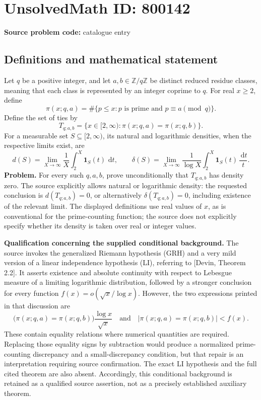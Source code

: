 \documentclass[11pt]{article}
\newcommand{\Z}{\mathbb{Z}}
\newcommand{\dd}{\,\mathrm{d}}
\begin{document}
\section*{UnsolvedMath ID: 800142}
\textbf{Source problem code:} catalogue entry
\subsection{Definitions and mathematical statement}
Let \(q\) be a positive integer, and let \(a,b\in\Z/q\Z\) be distinct reduced residue classes, meaning that each class is represented by an integer coprime to \(q\). For real \(x\geq 2\), define
\[
\pi(x;q,a)=\#\{p\leq x:p\text{ is prime and }p\equiv a\pmod q\}.
\]
Define the set of ties by
\[
T_{q;a,b}=\{x\in[2,\infty):\pi(x;q,a)=\pi(x;q,b)\}.
\]
For a measurable set \(S\subseteq[2,\infty)\), its natural and logarithmic densities, when the respective limits exist, are
\[
d(S)=\lim_{X\to\infty}\frac{1}{X}\int_2^X\mathbf{1}_S(t)\,\dd t,
\qquad
\delta(S)=\lim_{X\to\infty}\frac{1}{\log X}\int_2^X\mathbf{1}_S(t)\,\frac{\dd t}{t}.
\]
\textbf{Problem.} For every such \(q,a,b\), prove unconditionally that \(T_{q;a,b}\) has density zero. The source explicitly allows natural or logarithmic density: the requested conclusion is \(d(T_{q;a,b})=0\), or alternatively \(\delta(T_{q;a,b})=0\), including existence of the relevant limit. The displayed definitions use real values of \(x\), as is conventional for the prime-counting function; the source does not explicitly specify whether its density is taken over real or integer values.

\textbf{Qualification concerning the supplied conditional background.} The source invokes the generalized Riemann hypothesis (GRH) and a very mild version of a linear independence hypothesis (LI), referring to [Devin, Theorem 2.2]. It asserts existence and absolute continuity with respect to Lebesgue measure of a limiting logarithmic distribution, followed by a stronger conclusion for every function \(f(x)=o(\sqrt{x}/\log x)\). However, the two expressions printed in that discussion are
\[
\bigl(\pi(x;q,a)=\pi(x;q,b)\bigr)\frac{\log x}{\sqrt{x}}
\quad\text{and}\quad
\bigl|\pi(x;q,a)=\pi(x;q,b)\bigr|<f(x).
\]
These contain equality relations where numerical quantities are required. Replacing those equality signs by subtraction would produce a normalized prime-counting discrepancy and a small-discrepancy condition, but that repair is an interpretation requiring source confirmation. The exact LI hypothesis and the full cited theorem are also absent. Accordingly, this conditional background is retained as a qualified source assertion, not as a precisely established auxiliary theorem.
\end{document}
